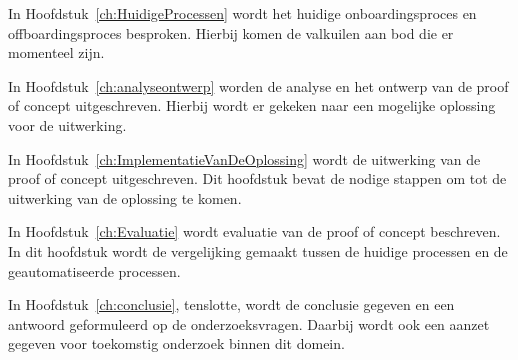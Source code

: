 
In Hoofdstuk~\ref{ch:HuidigeProcessen} wordt het huidige onboardingsproces en offboardingsproces besproken. Hierbij komen de valkuilen aan bod die er momenteel zijn. 

In Hoofdstuk~\ref{ch:analyseontwerp} worden de analyse en het ontwerp van de proof of concept uitgeschreven. Hierbij wordt er gekeken naar een mogelijke oplossing voor de uitwerking. 

In Hoofdstuk~\ref{ch:ImplementatieVanDeOplossing} wordt de uitwerking van de proof of concept uitgeschreven. Dit hoofdstuk bevat de nodige stappen om tot de uitwerking van de oplossing te komen.

In Hoofdstuk~\ref{ch:Evaluatie} wordt evaluatie van de proof of concept beschreven. In dit hoofdstuk wordt de vergelijking gemaakt tussen de huidige processen en de geautomatiseerde processen.

In Hoofdstuk~\ref{ch:conclusie}, tenslotte, wordt de conclusie gegeven en een antwoord geformuleerd op de onderzoeksvragen. Daarbij wordt ook een aanzet gegeven voor toekomstig onderzoek binnen dit domein.